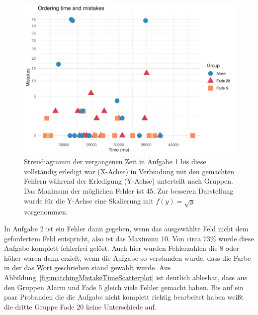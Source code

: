 \begin{figure}[H]
	\centering
	\includegraphics[width=\textwidth]{./_StudyResults/orderingMisTimeScat}
	\caption{Streudiagramm der vergangenen Zeit in Aufgabe 1 bis diese vollständig erledigt war (X-Achse) in Verbindung mit den gemachten Fehlern während der Erledigung (Y-Achse) unterteilt nach Gruppen. Das Maximum der möglichen Fehler ist 45. Zur besseren Darstellung wurde für die Y-Achse eine Skalierung mit $f(y) = \sqrt{y}$ vorgenommen.}
	\label{fig:orderingMistakeTimeScatterplot}
\end{figure}

In Aufgabe 2 ist ein Fehler dann gegeben, wenn das ausgewählte Feld nicht dem gefordertem Feld entspricht, also ist das Maximum 10.
Von circa 73\% wurde diese Aufgabe komplett fehlerfrei gelöst.
Auch hier wurden Fehlerzahlen die 8 oder höher waren dann erzielt, wenn die Aufgabe so verstanden wurde, dass die Farbe in der das Wort geschrieben stand gewählt wurde.
Aus Abbildung~\ref{fig:matchingMistakeTimeScatterplot} ist deutlich ablesbar, dass aus den Gruppen Alarm und Fade 5 gleich viele Fehler gemacht haben. Bis auf ein paar Probanden die die Aufgabe nicht komplett richtig bearbeitet haben weißt die dritte Gruppe Fade 20 keine Unterschiede auf.

